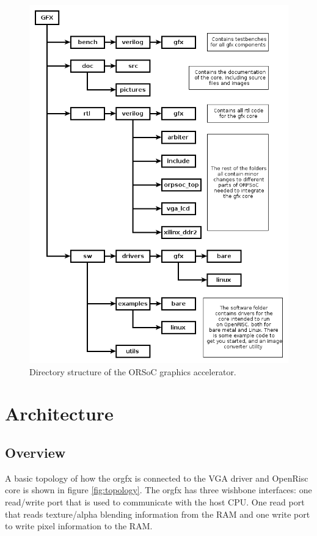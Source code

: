 \documentclass[10pt,a4paper]{article}
\begin{document}
\begin{figure}
\begin{center}
\includegraphics[scale=0.5]{../pictures/directory}
\caption{Directory structure of the ORSoC graphics accelerator.}
\label{fig:directory}
\end{center}
\end{figure}

\section{Architecture}
\subsection{Overview}
A basic topology of how the orgfx is connected to the VGA driver and OpenRisc core is shown in figure \ref{fig:topology}. The orgfx has three wishbone interfaces: one read/write port that is used to communicate with the host CPU. One read port that reads texture/alpha blending information from the RAM and one write port to write pixel information to the RAM.
\end{document}
